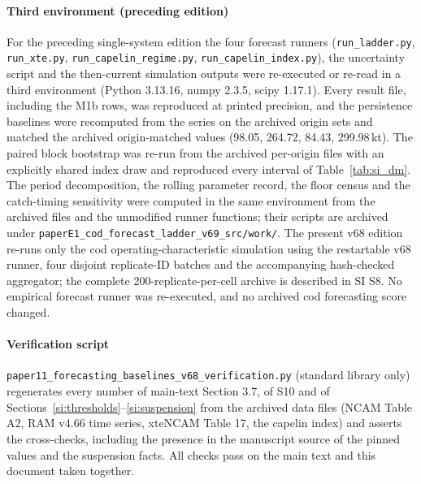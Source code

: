 \documentclass[preprint,11pt,authoryear]{elsarticle}
\theoremstyle{remark}
\begin{document}
\paragraph{Third environment (preceding edition)} For the preceding single-system edition the four forecast runners (\texttt{run\_ladder.py}, \texttt{run\_xte.py}, \texttt{run\_capelin\_regime.py}, \texttt{run\_capelin\_index.py}), the uncertainty script and the then-current simulation outputs were re-executed or re-read in a third environment (Python 3.13.16, numpy 2.3.5, scipy 1.17.1). Every result file, including the M1b rows, was reproduced at printed precision, and the persistence baselines were recomputed from the series on the archived origin sets and matched the archived origin-matched values (98.05, 264.72, 84.43, 299.98\,kt). The paired block bootstrap was re-run from the archived per-origin files with an explicitly shared index draw and reproduced every interval of Table~\ref{tab:si_dm}. The period decomposition, the rolling parameter record, the floor census and the catch-timing sensitivity were computed in the same environment from the archived files and the unmodified runner functions; their scripts are archived under \texttt{paperE1\_cod\_forecast\_ladder\_v69\_src/work/}. The present v68 edition re-runs only the cod operating-characteristic simulation using the restartable v68 runner, four disjoint replicate-ID batches and the accompanying hash-checked aggregator; the complete 200-replicate-per-cell archive is described in SI S8. No empirical forecast runner was re-executed, and no archived cod forecasting score changed.

\paragraph{Verification script} \texttt{paper11\_forecasting\_\allowbreak{}baselines\_v68\_\allowbreak{}verification.py} (standard library only) regenerates every number of main-text Section 3.7, of S10 and of Sections~\ref{si:thresholds}--\ref{si:suspension} from the archived data files (NCAM Table A2, RAM v4.66 time series, xteNCAM Table 17, the capelin index) and asserts the cross-checks, including the presence in the manuscript source of the pinned values and the suspension facts. All checks pass on the main text and this document taken together.
\end{document}
